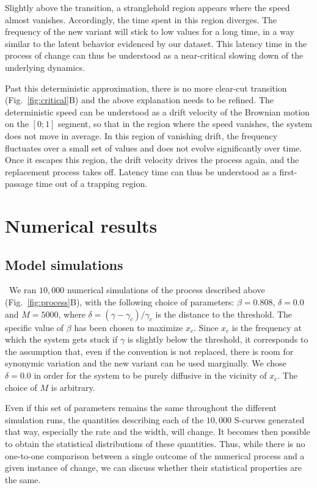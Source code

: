 \documentclass[12pt,twocolumn,amsmath,amssymb,aps,longbibliography]{revtex4-1}  %
\begin{document}
Slightly above the transition, a stranglehold region appears where the speed almost vanishes. Accordingly, the time spent in this region diverges. The frequency of the new variant will stick to low values for a long time, in a way similar to the latent behavior evidenced by our dataset. This latency time in the process of change can thus be understood as a near-critical slowing down of the underlying dynamics. 

Past this deterministic approximation, there is no more clear-cut transition (Fig.~\ref{fig:critical}B) and the above explanation needs to be refined. The deterministic speed can be understood as a drift velocity of the Brownian motion on the $[0;1]$ segment, so that in the region where the speed vanishes, the system does not move in average. In this region of vanishing drift, the frequency fluctuates over a small set of values and does not evolve significantly over time. Once it escapes this region, the drift velocity drives the process again, and the replacement process takes off. Latency time can thus be understood as a first-passage time out of a trapping region. 

\section*{Numerical results}

\subsection*{Model simulations}

\ We ran $10,000$ numerical simulations of the process described above (Fig.~\ref{fig:process}B), with the following choice of parameters: $\beta = 0.808$, $\delta = 0.0$ and $M = 5000$, where $\delta = (\gamma - \gamma_c) / \gamma_c$ is the distance to the threshold. The specific value of $\beta$ has been chosen to maximize $x_c$. Since $x_c$ is the frequency at which the system gets stuck if $\gamma$ is slightly below the threshold, it corresponds to the assumption that, even if the convention is not replaced, there is room for synonymic variation and the new variant can be used marginally. We chose $\delta = 0.0$ in order for the system to be purely diffusive in the vicinity of $x_c$. The choice of $M$ is arbitrary. 

Even if this set of parameters remains the same throughout the different simulation runs, the quantities describing each of the $10,000$ S-curves generated that way, especially the rate and the width, will change. It becomes then possible to obtain the statistical distributions of these quantities. Thus, while there is no one-to-one comparison between a single outcome of the numerical process and a given instance of change, we can discuss whether their statistical properties are the same. 
\end{document}
